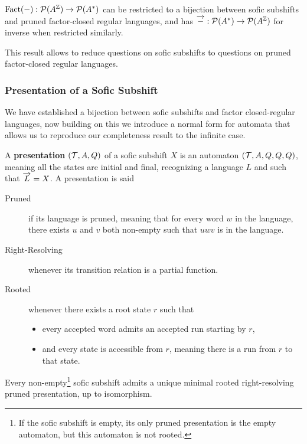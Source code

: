 \begin{proposition}\label{prop:bijection-subshifts}
	$\mathrm{Fact}(-) : {\mathcal{P}}(A^{\mathbb{Z}}) \to {\mathcal{P}}(A^*)$ can be restricted to a bijection between sofic subshifts and pruned factor-closed regular languages, and has $\overrightarrow{-} : {\mathcal{P}}(A^*) \to {\mathcal{P}}(A^{\mathbb{Z}})$ for inverse when restricted similarly.
\end{proposition}

This result allows to reduce questions on sofic subshifts to questions on pruned factor-closed regular languages.

\subsubsection{Presentation of a Sofic Subshift}

We have established a bijection between sofic subshifts and factor closed-regular languages, now building on this we introduce a normal form for automata that allows us to reproduce our completeness result to the infinite case.

\begin{definition}
	A \textbf{presentation} $({\mathcal{T}},A,Q)$ of a sofic subshift $X$ is an automaton $({\mathcal{T}},A,Q,Q,Q)$, meaning  all the  states are initial and final, recognizing a language $L$ and such that $\overrightarrow{L}=X$. A presentation is said 
	\begin{description}
		\item[Pruned] if its language is pruned, meaning that for every word $w$ in the language, there exists $u$ and $v$ both non-empty such that $uwv$ is in the language.
		\item[Right-Resolving] whenever its transition relation is a partial function.
		\item[Rooted] whenever there exists a root state $r$ such that
		\begin{itemize}
			\item every accepted word admits an accepted run starting by $r$,
			\item and every state is accessible from $r$, meaning there is a run from $r$ to that state.
		\end{itemize}
	\end{description}
\end{definition}

\begin{theorem}[Uniqueness]\label{thm:minimal-uniqueness-inf}
	Every non-empty\footnote{If the sofic subshift is empty, its only pruned presentation is the empty automaton, but this automaton is not rooted.} sofic subshift admits a unique minimal rooted right-resolving pruned presentation, up to isomorphism.
\end{theorem}

